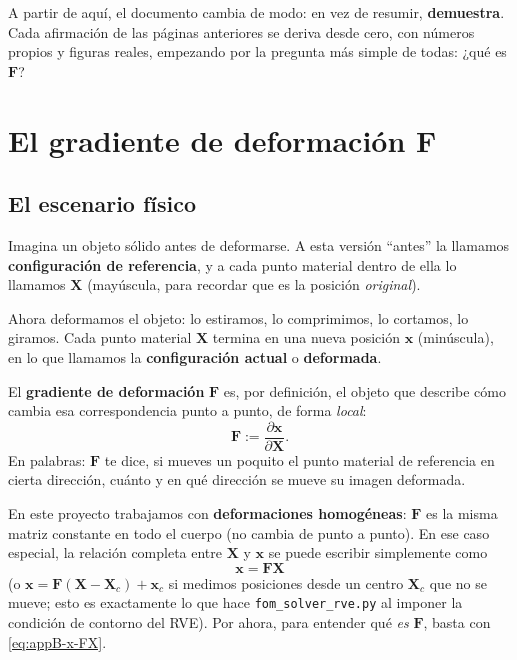 \documentclass[11pt,a4paper]{article}
\begin{document}
\bigskip
\noindent A partir de aqu\'i, el documento cambia de modo: en vez de
resumir, \textbf{demuestra}. Cada afirmaci\'on de las p\'aginas
anteriores se deriva desde cero, con n\'umeros propios y figuras
reales, empezando por la pregunta m\'as simple de todas: ¿qu\'e es
$\bm F$?

\tableofcontents

\section{El gradiente de deformaci\'on $\bm F$}
\label{ch:F}

\subsection{El escenario f\'isico}

Imagina un objeto s\'olido antes de deformarse. A esta versi\'on
``antes'' la llamamos \textbf{configuraci\'on de referencia}, y a cada
punto material dentro de ella lo llamamos $\bm X$ (may\'uscula, para
recordar que es la posici\'on \emph{original}).

Ahora deformamos el objeto: lo estiramos, lo comprimimos, lo cortamos,
lo giramos. Cada punto material $\bm X$ termina en una nueva posici\'on
$\bm x$ (min\'uscula), en lo que llamamos la \textbf{configuraci\'on
actual} o \textbf{deformada}.

El \textbf{gradiente de deformaci\'on} $\bm F$ es, por definici\'on, el
objeto que describe c\'omo cambia esa correspondencia punto a punto, de
forma \emph{local}:
\begin{equation}
 \bm F := \frac{\partial \bm x}{\partial \bm X}.
 \label{eq:appB-F-def}
\end{equation}
En palabras: $\bm F$ te dice, si mueves un poquito el punto material
de referencia en cierta direcci\'on, cu\'anto y en qu\'e direcci\'on se
mueve su imagen deformada.

En este proyecto trabajamos con \textbf{deformaciones homog\'eneas}:
$\bm F$ es la misma matriz constante en todo el cuerpo (no cambia de
punto a punto). En ese caso especial, la relaci\'on completa entre
$\bm X$ y $\bm x$ se puede escribir simplemente como
\begin{equation}
 \bm x = \bm F\bm X
 \label{eq:appB-x-FX}
\end{equation}
(o $\bm x=\bm F(\bm X-\bm X_c)+\bm x_c$ si medimos posiciones desde un
centro $\bm X_c$ que no se mueve; esto es exactamente lo que hace
\texttt{fom\_solver\_rve.py} al imponer la condici\'on de contorno del
RVE). Por ahora, para entender qu\'e \emph{es} $\bm F$, basta con
\eqref{eq:appB-x-FX}.
\end{document}
